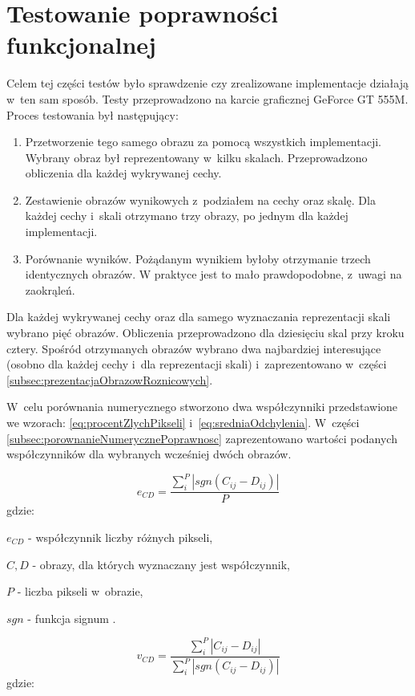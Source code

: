 \section{Testowanie poprawności funkcjonalnej}
\label{sec:testPoprawnosc}

Celem tej części testów było sprawdzenie czy zrealizowane implementacje działają w~ten sam sposób. Testy przeprowadzono na karcie graficznej GeForce GT 555M. Proces testowania był następujący:

\begin{enumerate}
\item Przetworzenie tego samego obrazu za pomocą wszystkich implementacji. Wybrany obraz był reprezentowany w~kilku skalach. Przeprowadzono obliczenia dla każdej wykrywanej cechy.
\item Zestawienie obrazów wynikowych z~podziałem na cechy oraz skalę. Dla każdej cechy i~skali otrzymano trzy obrazy, po jednym dla każdej implementacji.
\item Porównanie wyników. Pożądanym wynikiem byłoby otrzymanie trzech identycznych obrazów. W praktyce jest to mało prawdopodobne, z~uwagi na zaokrąleń.
\end{enumerate}

Dla każdej wykrywanej cechy oraz dla samego wyznaczania reprezentacji skali wybrano pięć obrazów. Obliczenia przeprowadzono dla dziesięciu skal przy kroku cztery. Spośród otrzymanych obrazów wybrano dwa najbardziej interesujące (osobno dla każdej cechy i~dla reprezentacji skali) i~zaprezentowano w~części \ref{subsec:prezentacjaObrazowRoznicowych}.

W~celu porównania numerycznego stworzono dwa współczynniki przedstawione we wzorach: \eqref{eq:procentZlychPikseli} i~\eqref{eq:sredniaOdchylenia}. W~części \ref{subsec:porownanieNumerycznePoprawnosc} zaprezentowano wartości podanych współczynników dla wybranych wcześniej dwóch obrazów.

\begin{equation}
\label{eq:procentZlychPikseli}
e_{CD} = \frac{\sum_{i}^{P}|sgn(C_{ij}-D_{ij})	|}{P}
\end{equation}
gdzie:

$ e_{CD} $ - współczynnik liczby różnych pikseli,

$ C, D $ - obrazy, dla których wyznaczany jest współczynnik,

$ P $ - liczba pikseli w~obrazie,

$ sgn $ - funkcja signum \cite{Signum}.

\begin{equation}
\label{eq:sredniaOdchylenia}
v_{CD} = \frac{\sum_{i}^{P}|C_{ij}-D_{ij}|}{\sum_{i}^{P}|sgn(C_{ij}-D_{ij})|}
\end{equation}
gdzie:

